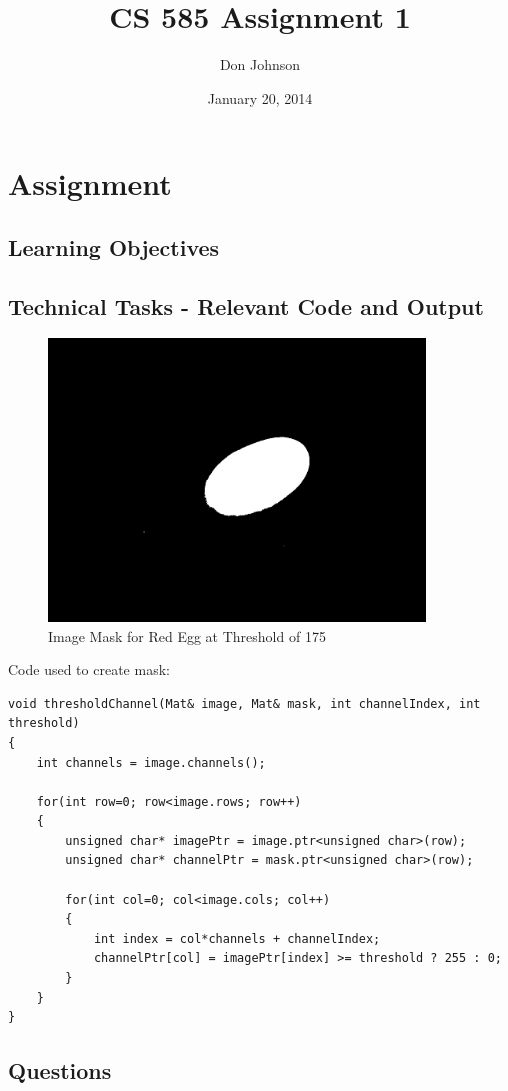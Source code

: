 \documentclass{article}
\title{CS 585 Assignment 1}
\author{Don Johnson}
\date{January 20, 2014}
\begin{document}
\maketitle
\section{Assignment}
\subsection{Learning Objectives}
\subsection{Technical Tasks - Relevant Code and Output}
\begin{figure}[ht!]
\centering
\includegraphics[width=100mm]{redEggThresholded175.png}
\caption{Image Mask for Red Egg at Threshold of 175}
\label{overflow}
\end{figure}

Code used to create mask:
\begin{lstlisting}
void thresholdChannel(Mat& image, Mat& mask, int channelIndex, int threshold)
{
    int channels = image.channels();

    for(int row=0; row<image.rows; row++)
    {
        unsigned char* imagePtr = image.ptr<unsigned char>(row);
        unsigned char* channelPtr = mask.ptr<unsigned char>(row);

        for(int col=0; col<image.cols; col++)
        {
            int index = col*channels + channelIndex;
            channelPtr[col] = imagePtr[index] >= threshold ? 255 : 0;
        }
    }
}
\end{lstlisting}

\subsection{Questions}
\end{document}
